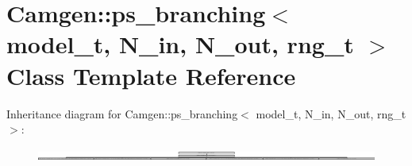 \hypertarget{a00437}{\section{Camgen\-:\-:ps\-\_\-branching$<$ model\-\_\-t, N\-\_\-in, N\-\_\-out, rng\-\_\-t $>$ Class Template Reference}
\label{a00437}
}
Inheritance diagram for Camgen\-:\-:ps\-\_\-branching$<$ model\-\_\-t, N\-\_\-in, N\-\_\-out, rng\-\_\-t $>$\-:\begin{figure}[H]
\begin{center}
\leavevmode
\includegraphics[height=0.313199cm]{a00437}
\end{center}
\end{figure}
